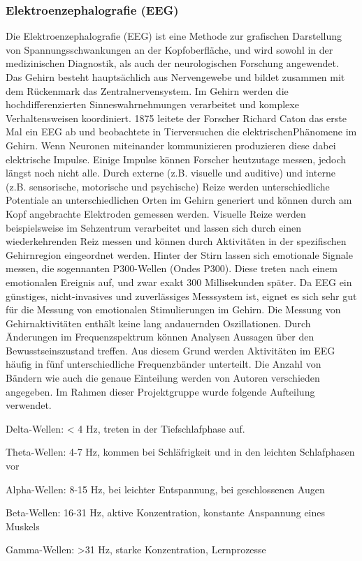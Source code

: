 \subsubsection{Elektroenzephalografie (EEG)} \label{grund-eeg-subsubsec}


Die Elektroenzephalografie (EEG) ist eine Methode zur grafischen Darstellung von Spannungsschwankungen an der Kopfoberfläche, und wird sowohl in der medizinischen Diagnostik, als auch der neurologischen Forschung angewendet. Das Gehirn besteht hauptsächlich aus Nervengewebe und bildet zusammen mit dem Rückenmark das Zentralnervensystem. Im Gehirn werden die hochdifferenzierten Sinneswahrnehmungen verarbeitet und komplexe Verhaltensweisen koordiniert. 1875 leitete der Forscher Richard Caton das erste Mal ein EEG ab und beobachtete in Tierversuchen die elektrischenPhänomene im Gehirn. Wenn Neuronen miteinander kommunizieren produzieren diese dabei elektrische Impulse. Einige Impulse können Forscher heutzutage messen, jedoch längst noch nicht alle. Durch externe (z.B. visuelle und auditive) und interne (z.B. sensorische, motorische und psychische) Reize werden unterschiedliche Potentiale an unterschiedlichen Orten im Gehirn generiert und können durch am Kopf angebrachte Elektroden gemessen werden. Visuelle Reize werden beispielsweise im Sehzentrum verarbeitet und lassen sich durch einen wiederkehrenden Reiz messen und können durch Aktivitäten in der spezifischen Gehirnregion eingeordnet werden. Hinter der Stirn lassen sich emotionale Signale messen, die sogennanten P300-Wellen (Ondes P300). Diese treten nach einem emotionalen Ereignis auf, und zwar exakt 300 Millisekunden später.  Da EEG ein günstiges, nicht-invasives und zuverlässiges Messsystem ist, eignet es sich sehr gut für die Messung von emotionalen Stimulierungen im Gehirn. 
Die Messung von Gehirnaktivitäten enthält keine lang andauernden Oszillationen. Durch Änderungen im Frequenzspektrum können Analysen Aussagen über den Bewusstseinszustand treffen. Aus diesem Grund werden Aktivitäten im EEG häufig in fünf unterschiedliche Frequenzbänder unterteilt. Die Anzahl von Bändern wie auch die genaue Einteilung werden von Autoren verschieden angegeben. Im Rahmen dieser Projektgruppe wurde folgende Aufteilung verwendet.

Delta-Wellen: < 4 Hz, treten in der Tiefschlafphase auf.

Theta-Wellen: 4-7 Hz, kommen bei Schläfrigkeit und in den leichten Schlafphasen vor 

Alpha-Wellen: 8-15 Hz, bei leichter Entspannung, bei geschlossenen Augen

Beta-Wellen: 16-31 Hz, aktive Konzentration, konstante Anspannung eines Muskels

Gamma-Wellen: >31 Hz, starke Konzentration, Lernprozesse
